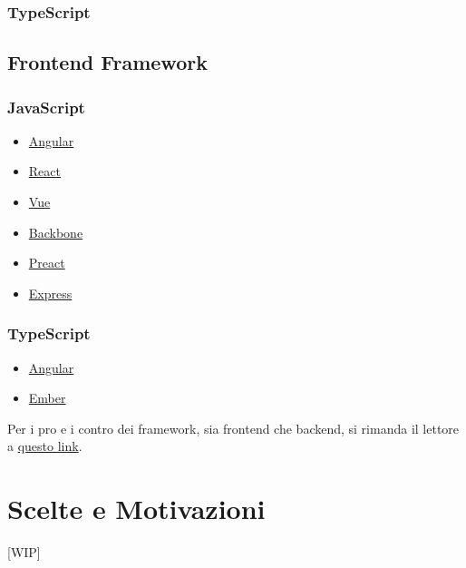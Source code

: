 \documentclass[a4paper, 12pt]{article}
\begin{document}
\subsubsection{TypeScript}

\subsection{Frontend Framework}
\subsubsection{JavaScript}
\begin{itemize}
    \item \href{https://angularjs.org/}{Angular}
    \item \href{https://react.dev/}{React}
    \item \href{https://vuejs.org/}{Vue}
    \item \href{https://backbonejs.org/}{Backbone}
    \item \href{https://preactjs.com/}{Preact}
    \item \href{https://expressjs.com/}{Express}
\end{itemize}
\subsubsection{TypeScript}
\begin{itemize}
    \item \href{https://angularjs.org/}{Angular}
    \item \href{https://emberjs.com/}{Ember}
\end{itemize}
Per i pro e i contro dei framework, sia frontend che backend, si rimanda il lettore a \href{https://blog.geekandjob.com/framework-javascript/}{questo link}.
\newpage
\section{Scelte e Motivazioni}
[WIP]
\end{document}
